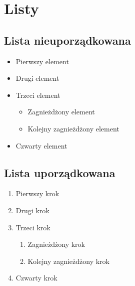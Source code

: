 \documentclass{article}
\begin{document}
\section{Listy}



\subsection{Lista nieuporządkowana}



\begin{itemize}
  \item Pierwszy element

  \item Drugi element

  \item Trzeci element
\begin{itemize}
  \item Zagnieżdżony element

  \item Kolejny zagnieżdżony element

\end{itemize}


  \item Czwarty element

\end{itemize}



\subsection{Lista uporządkowana}



\begin{enumerate}
  \item Pierwszy krok

  \item Drugi krok

  \item Trzeci krok
\begin{enumerate}
  \item Zagnieżdżony krok

  \item Kolejny zagnieżdżony krok

\end{enumerate}


  \item Czwarty krok

\end{enumerate}
\end{document}
